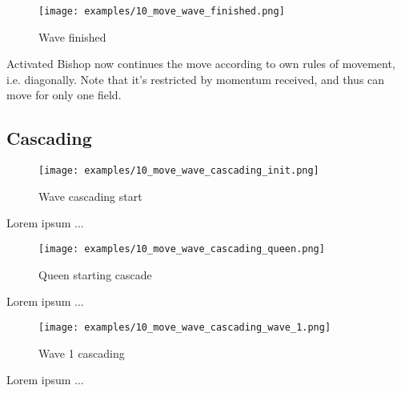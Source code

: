 \noindent
\begin{figure}[h]
\texttt{[image: examples/10\_move\_wave\_finished.png]}
\caption{Wave finished}
\label{fig:wave_finished}
\end{figure}

Activated Bishop now continues the move according to own rules of movement,
i.e. diagonally. Note that it's restricted by momentum received, and thus
can move for only one field.

\clearpage %

\subsection*{Cascading}


\noindent
\begin{wrapfigure}[1]{l}{0.4375\textwidth}
\texttt{[image: examples/10\_move\_wave\_cascading\_init.png]}
\caption{Wave cascading start}
\label{fig:mv_wave_cascading_start}
\end{wrapfigure}
Lorem ipsum ...

\vspace*{60.0mm}
\noindent
\begin{wrapfigure}[1]{r}{0.4375\textwidth}
\texttt{[image: examples/10\_move\_wave\_cascading\_queen.png]}
\caption{Queen starting cascade}
\label{fig:mv_queen_starting_cascade}
\end{wrapfigure}
Lorem ipsum ...

\clearpage %

\noindent
\begin{wrapfigure}[1]{l}{0.4375\textwidth}
\texttt{[image: examples/10\_move\_wave\_cascading\_wave\_1.png]}
\caption{Wave 1 cascading}
\label{fig:mv_wave_1_cascading}
\end{wrapfigure}
Lorem ipsum ...

